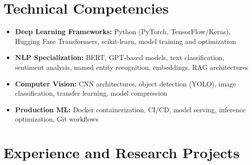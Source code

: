 \documentclass[a4paper,11pt]{article}
\begin{document}
\vspace{4pt}

\section{Technical Competencies}
\begin{itemize}[leftmargin=*, nosep]
    \item \small{\textbf{Deep Learning Frameworks:} Python (PyTorch, TensorFlow/Keras), Hugging Face Transformers, scikit-learn, model training and optimization}
    \item \small{\textbf{NLP Specialization:} BERT, GPT-based models, text classification, sentiment analysis, named entity recognition, embeddings, RAG architectures}
    \item \small{\textbf{Computer Vision:} CNN architectures, object detection (YOLO), image classification, transfer learning, model compression}
    \item \small{\textbf{Production ML:} Docker containerization, CI/CD, model serving, inference optimization, Git workflows}
\end{itemize}

\vspace{4pt}

\section{Experience and Research Projects}
\end{document}
